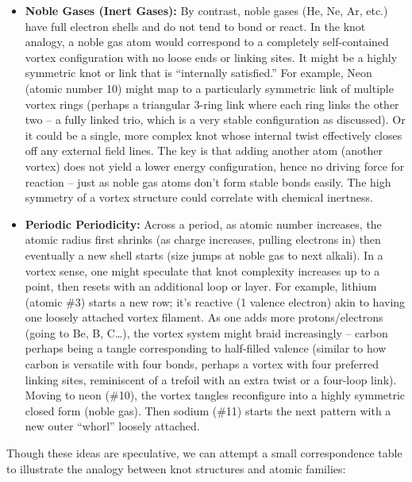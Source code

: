 \documentclass[a4paper,12pt]{article}
\begin{document}
\begin{itemize}
            \item \textbf{Noble Gases (Inert Gases):} By contrast, noble gases (He, Ne, Ar, etc.) have full electron shells and do not tend to bond or react. In the knot analogy, a noble gas atom would correspond to a completely self-contained vortex configuration with no loose ends or linking sites. It might be a highly symmetric knot or link that is ``internally satisfied.'' For example, Neon (atomic number 10) might map to a particularly symmetric link of multiple vortex rings (perhaps a triangular 3-ring link where each ring links the other two -- a fully linked trio, which is a very stable configuration as discussed). Or it could be a single, more complex knot whose internal twist effectively closes off any external field lines. The key is that adding another atom (another vortex) does not yield a lower energy configuration, hence no driving force for reaction -- just as noble gas atoms don't form stable bonds easily. The high symmetry of a vortex structure could correlate with chemical inertness.
        
            \item \textbf{Periodic Periodicity:} Across a period, as atomic number increases, the atomic radius first shrinks (as charge increases, pulling electrons in) then eventually a new shell starts (size jumps at noble gas to next alkali). In a vortex sense, one might speculate that knot complexity increases up to a point, then resets with an additional loop or layer. For example, lithium (atomic \#3) starts a new row; it's reactive (1 valence electron) akin to having one loosely attached vortex filament. As one adds more protons/electrons (going to Be, B, C\ldots), the vortex system might braid increasingly -- carbon perhaps being a tangle corresponding to half-filled valence (similar to how carbon is versatile with four bonds, perhaps a vortex with four preferred linking sites, reminiscent of a trefoil with an extra twist or a four-loop link). Moving to neon (\#10), the vortex tangles reconfigure into a highly symmetric closed form (noble gas). Then sodium (\#11) starts the next pattern with a new outer ``whorl'' loosely attached.
        \end{itemize}
        
        Though these ideas are speculative, we can attempt a small correspondence table to illustrate the analogy between knot structures and atomic families:
        
\end{document}
